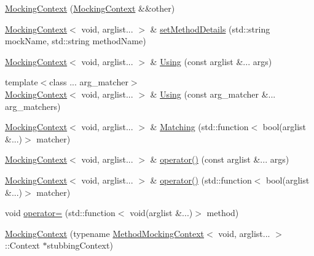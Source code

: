 \begin{DoxyCompactItemize}
\item 
\mbox{\hyperlink{classfakeit_1_1MockingContext_3_01void_00_01arglist_8_8_8_01_4_a1f7b3663809191b919290f0db05d59f1}{Mocking\+Context}} (\mbox{\hyperlink{classfakeit_1_1MockingContext}{Mocking\+Context}} \&\&other)
\item 
\mbox{\hyperlink{classfakeit_1_1MockingContext}{Mocking\+Context}}$<$ void, arglist... $>$ \& \mbox{\hyperlink{classfakeit_1_1MockingContext_3_01void_00_01arglist_8_8_8_01_4_a5479ea5b1a1f32898cc9592bfb1c7777}{set\+Method\+Details}} (std\+::string mock\+Name, std\+::string method\+Name)
\item 
\mbox{\hyperlink{classfakeit_1_1MockingContext}{Mocking\+Context}}$<$ void, arglist... $>$ \& \mbox{\hyperlink{classfakeit_1_1MockingContext_3_01void_00_01arglist_8_8_8_01_4_a0dad4e59214a5fdcacad0e4a170df071}{Using}} (const arglist \&... args)
\item 
{\footnotesize template$<$class ... arg\+\_\+matcher$>$ }\\\mbox{\hyperlink{classfakeit_1_1MockingContext}{Mocking\+Context}}$<$ void, arglist... $>$ \& \mbox{\hyperlink{classfakeit_1_1MockingContext_3_01void_00_01arglist_8_8_8_01_4_aaab0ad3883ab87bd3885671e3266546e}{Using}} (const arg\+\_\+matcher \&... arg\+\_\+matchers)
\item 
\mbox{\hyperlink{classfakeit_1_1MockingContext}{Mocking\+Context}}$<$ void, arglist... $>$ \& \mbox{\hyperlink{classfakeit_1_1MockingContext_3_01void_00_01arglist_8_8_8_01_4_a28152fc4e0105f5e6424515367a5d4c3}{Matching}} (std\+::function$<$ bool(arglist \&...)$>$ matcher)
\item 
\mbox{\hyperlink{classfakeit_1_1MockingContext}{Mocking\+Context}}$<$ void, arglist... $>$ \& \mbox{\hyperlink{classfakeit_1_1MockingContext_3_01void_00_01arglist_8_8_8_01_4_a73476d376f7ec5631ba9a37ff5264599}{operator()}} (const arglist \&... args)
\item 
\mbox{\hyperlink{classfakeit_1_1MockingContext}{Mocking\+Context}}$<$ void, arglist... $>$ \& \mbox{\hyperlink{classfakeit_1_1MockingContext_3_01void_00_01arglist_8_8_8_01_4_a1a5a55569a763877d395635979e6b3d6}{operator()}} (std\+::function$<$ bool(arglist \&...)$>$ matcher)
\item 
void \mbox{\hyperlink{classfakeit_1_1MockingContext_3_01void_00_01arglist_8_8_8_01_4_a86584df9e9a7a73b078ad68fa5893d50}{operator=}} (std\+::function$<$ void(arglist \&...)$>$ method)
\item 
\mbox{\hyperlink{classfakeit_1_1MockingContext_3_01void_00_01arglist_8_8_8_01_4_a655f7e31674dfb282f30a94f31ffd2a7}{Mocking\+Context}} (typename \mbox{\hyperlink{classfakeit_1_1MethodMockingContext}{Method\+Mocking\+Context}}$<$ void, arglist... $>$\+::Context $\ast$stubbing\+Context)

\end{DoxyCompactItemize}
